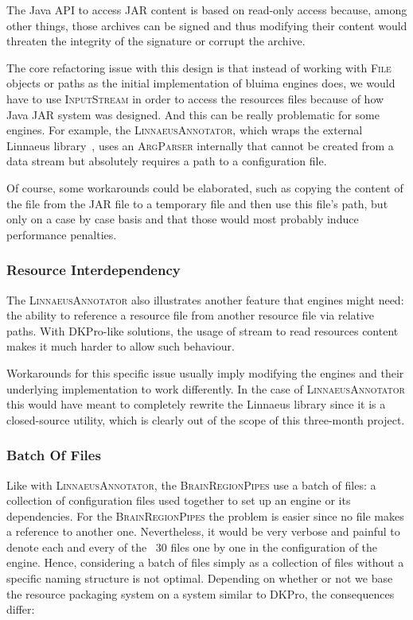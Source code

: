 \documentclass{article}
\newcommand{\ID}[1]{{\textsc{#1}}}
\newcommand{\JAR}{JAR\xspace}
\begin{document}
The Java API to access \JAR content is based on read-only access because, among other things, those
archives can be signed and thus modifying their content would threaten the integrity of the
signature or corrupt the archive.

The core refactoring issue with this design is that instead of working with \ID{File} objects or
paths as the initial implementation of bluima engines does, we would have to use \ID{InputStream} in
order to access the resources files because of how Java \JAR system was designed. And this can be
really problematic for some engines. For example, the \ID{LinnaeusAnnotator}, which wraps the
external Linnaeus library~\cite{linnaeus}, uses an \ID{ArgParser} internally that cannot be created
from a data stream but absolutely requires a path to a configuration file.

Of course, some workarounds could be elaborated, such as copying the content of the file from the
\JAR file to a temporary file and then use this file's path, but only on a case by case basis and
that those would most probably induce performance penalties.

\subsubsection{Resource Interdependency}

The \ID{LinnaeusAnnotator} also illustrates another feature that engines might need: the ability to
reference a resource file from another resource file via relative paths. With DKPro-like solutions,
the usage of stream to read resources content makes it much harder to allow such behaviour.

Workarounds for this specific issue usually imply modifying the engines and their underlying
implementation to work differently. In the case of \ID{Linnaeus\-Annotator} this would have meant to
completely rewrite the Linnaeus library since it is a closed-source utility, which is clearly out of
the scope of this three-month project.

\subsubsection{Batch Of Files}

Like with \ID{LinnaeusAnnotator}, the \ID{BrainRegionPipes} use a batch of files: a collection of
configuration files used together to set up an engine or its dependencies. For the
\ID{BrainRegionPipes} the problem is easier since no file makes a reference to another one.
Nevertheless, it would be very verbose and painful to denote each and every of the ~30 files one by
one in the configuration of the engine. Hence, considering a batch of files simply as a collection
of files without a specific naming structure is not optimal. Depending on whether or not we base the
resource packaging system on a system similar to DKPro, the consequences differ:
\end{document}
